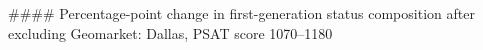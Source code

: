 #### Percentage-point change in first-generation status composition after excluding Geomarket: Dallas, PSAT score 1070–1180
